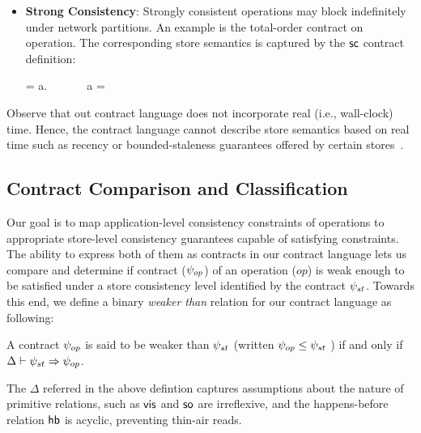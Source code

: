 \begin{itemize}
\item \textbf{Strong Consistency}: Strongly consistent operations may block
  indefinitely under network partitions. An example is the total-order
  contract on  operation. The corresponding store semantics is
  captured by the ${\sf sc}$ contract definition:

  \vspace{-1em}
  \begin{smathpar}
  \scc = \forall a.~ \Rightarrow {} ~\vee~  ~\vee~ a = \cureff
  \end{smathpar}

\end{itemize}

Observe that out contract language does not incorporate real (i.e.,
wall-clock) time. Hence, the contract language cannot describe store
semantics based on real time such as recency or bounded-staleness
guarantees offered by certain stores~\cite{Pileus}.




\subsection{Contract Comparison and Classification}

Our goal is to map application-level consistency constraints of operations to
appropriate store-level consistency guarantees capable of satisfying
constraints.  The ability to express both of them as contracts in our contract
language lets us compare and determine if contract ($\psi_{op}$) of an operation
($op$) is weak enough to be satisfied under a store consistency level
identified by the contract $\psi_{st}$.  Towards this end, we
define a binary \emph{weaker than} relation for our contract language as
following:

\begin{definition}
A contract $\psi_{op}$ is said to be weaker than $\psi_{st}$ (written $\psi_{op}
\le \psi_{st}$ ) if and only if $\Delta \vdash \psi_{st} \Rightarrow \psi_{op}$.
\begin{center}
\end{center}
\end{definition}

\vspace{-1em}
\noindent The $\Delta$ referred in the above defintion captures
assumptions about the nature of primitive relations, such as ${\normalfont \textsf{vis}}$
and ${\normalfont \textsf{so}}$ are irreflexive, and the happens-before relation ${\normalfont \textsf{hb}}$ is
acyclic, preventing thin-air reads.

